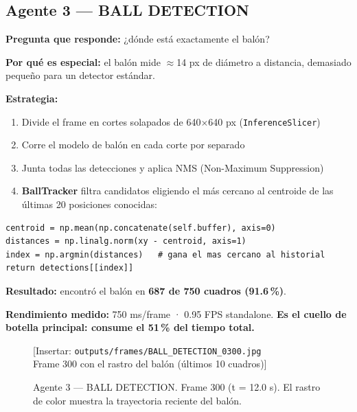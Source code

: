 \documentclass[11pt,a4paper]{article}
\begin{document}
\subsection{Agente 3 — BALL DETECTION}

\textbf{Pregunta que responde:} ¿dónde está exactamente el balón?

\textbf{Por qué es especial:} el balón mide $\approx$14 px de diámetro a
distancia, demasiado pequeño para un detector estándar.

\textbf{Estrategia:}
\begin{enumerate}[noitemsep]
  \item Divide el frame en cortes solapados de 640$\times$640 px
        (\texttt{InferenceSlicer})
  \item Corre el modelo de balón en cada corte por separado
  \item Junta todas las detecciones y aplica NMS (Non-Maximum Suppression)
  \item \textbf{BallTracker} filtra candidatos eligiendo el más cercano al
        centroide de las últimas 20 posiciones conocidas:
\end{enumerate}

\begin{lstlisting}[caption={Lógica del BallTracker — sports/common/ball.py}]
centroid = np.mean(np.concatenate(self.buffer), axis=0)
distances = np.linalg.norm(xy - centroid, axis=1)
index = np.argmin(distances)   # gana el mas cercano al historial
return detections[[index]]
\end{lstlisting}

\textbf{Resultado:} encontró el balón en \textbf{687 de 750 cuadros (91.6\,\%)}.

\textbf{Rendimiento medido:} 750 ms/frame · 0.95 FPS standalone.
\textbf{Es el cuello de botella principal: consume el 51\,\% del tiempo total.}

\begin{figure}[H]
  \centering
  \begin{mdframed}[
    linecolor=gray!40, linewidth=1pt,
    innertopmargin=50pt, innerbottommargin=50pt,
    backgroundcolor=gray!8
  ]
    \centering\color{gray!60}
    [Insertar: \texttt{outputs/frames/BALL\_DETECTION\_0300.jpg} \\
    Frame 300 con el rastro del balón (últimos 10 cuadros)]
  \end{mdframed}
  \caption{Agente 3 — BALL DETECTION. Frame 300 (t = 12.0 s).
           El rastro de color muestra la trayectoria reciente del balón.}
  \label{fig:ball}
\end{figure}
\end{document}
